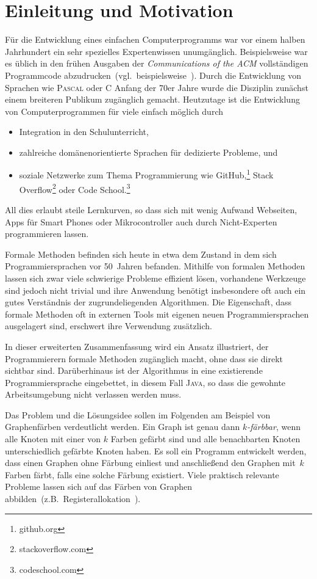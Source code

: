 \documentclass[a4paper,fontsize=12pt,headings=small,captions=tableheading,%
numbers=endperiod,abstracton,pdftex]{scrartcl}
\begin{document}
\section{Einleitung und Motivation}
Für die Entwicklung eines einfachen Computerprogramms war vor einem halben
Jahrhundert ein sehr spezielles Expertenwissen unumgänglich.  Beispielsweise war
es üblich in den frühen Ausgaben der \textsl{Communications of the ACM}
vollständigen Programmcode abzudrucken~(vgl.~beispielsweise~\cite{Gib:75}).
Durch die Entwicklung von Sprachen wie \textsc{Pascal} oder \textsc{C} Anfang
der 70er Jahre wurde die Disziplin zunächst einem breiteren Publikum zugänglich
gemacht.  Heutzutage ist die Entwicklung von Computerprogrammen für viele
einfach möglich durch
\begin{itemize}
\item Integration in den Schulunterricht,
\item zahlreiche domänenorientierte Sprachen für dedizierte Probleme, und
\item soziale Netzwerke zum Thema Programmierung wie
  GitHub,\footnote{github.org} Stack Overflow\footnote{stackoverflow.com} oder
  Code School.\footnote{codeschool.com}
\end{itemize}
All dies erlaubt steile Lernkurven, so dass sich mit wenig Aufwand Webseiten,
Apps für Smart Phones oder Mikrocontroller auch durch Nicht-Experten
programmieren lassen.

Formale Methoden befinden sich heute in etwa dem Zustand in dem sich
Programmiersprachen vor 50~Jahren befanden.  Mithilfe von formalen Methoden
lassen sich zwar viele schwierige Probleme effizient lösen, vorhandene Werkzeuge
sind jedoch nicht trivial und ihre Anwendung benötigt insbesondere oft auch ein
gutes Verständnis der zugrundeliegenden Algorithmen.  Die Eigenschaft, dass
formale Methoden oft in externen Tools mit eigenen neuen Programmiersprachen
ausgelagert sind, erschwert ihre Verwendung zusätzlich.

In dieser erweiterten Zusammenfassung wird ein Ansatz illustriert, der
Programmierern formale Methoden zugänglich macht, ohne dass sie direkt sichtbar
sind.  Darüberhinaus ist der Algorithmus in eine existierende Programmiersprache
eingebettet, in diesem Fall \textsc{Java}, so dass die gewohnte Arbeitsumgebung
nicht verlassen werden muss.

Das Problem und die Lösungsidee sollen im Folgenden am Beispiel von
Graphenfärben verdeutlicht werden.  Ein Graph ist genau dann \emph{$k$-färbbar},
wenn alle Knoten mit einer von $k$ Farben gefärbt sind und alle benachbarten
Knoten unterschiedlich gefärbte Knoten haben.  Es soll ein Programm entwickelt
werden, dass einen Graphen ohne Färbung einliest und anschließend den Graphen
mit~$k$ Farben färbt, falls eine solche Färbung existiert.  Viele praktisch
relevante Probleme lassen sich auf das Färben von Graphen
abbilden~(z.B.~Registerallokation~\cite{CAC+:81}).
\end{document}
